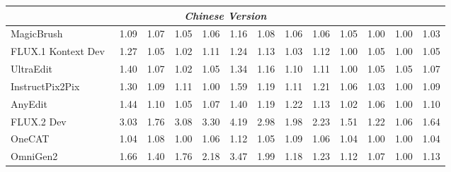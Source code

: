 \begin{table}[t]
{\begin{tabular}{l|cccccc|cccccc}
            

            

            \midrule
            \multicolumn{13}{c}{\textit{Chinese Version}} \\
            \midrule

            MagicBrush~\cite{zhang2023magicbrush}
            & 1.09 & 1.07 & 1.05 & 1.06 & 1.16 & \cellcolor[HTML]{C8C8C8}1.08 & 1.06 & 1.06 & 1.05 & 1.00 & 1.00 
            & \cellcolor[HTML]{C8C8C8}1.03 \\

            FLUX.1 Kontext Dev~\cite{labs2025flux}
            & 1.27 & 1.05 & 1.02 & 1.11 & 1.24 &\cellcolor[HTML]{C8C8C8}1.13 & 1.03 & 1.12 & 1.00 & 1.05 & 1.00
            & \cellcolor[HTML]{C8C8C8}1.05 \\

            UltraEdit~\cite{zhao2024ultraedit}
            & 1.40 & 1.07 & 1.02 & 1.05 & 1.34 &  \cellcolor[HTML]{C8C8C8}1.16 & 1.10 & 1.11 & 1.00 & 1.05 & 1.05
            & \cellcolor[HTML]{C8C8C8}1.07  \\

            InstructPix2Pix~\cite{brooks2023instructpix2pix}
            & 1.30 & 1.09 & 1.11 & 1.00 & 1.59 & \cellcolor[HTML]{C8C8C8}1.19 & 1.11 & 1.21 & 1.06 & 1.03 & 1.00
            & \cellcolor[HTML]{C8C8C8}1.09 \\

            AnyEdit~\cite{yu2025anyedit}
            & 1.44 & 1.10 & 1.05 & 1.07 & 1.40 &  \cellcolor[HTML]{C8C8C8}1.19 & 1.22 & 1.13 & 1.02 & 1.06 & 1.00
            & \cellcolor[HTML]{C8C8C8}1.10 \\

            

            FLUX.2 Dev~\cite{flux-2-2025}
            & 3.03 & 1.76 & 3.08 & 3.30 & 4.19 &  \cellcolor[HTML]{C8C8C8} 2.98  & 1.98 & 2.23 & 1.51 & 1.22 & 1.06
            & \cellcolor[HTML]{C8C8C8} 1.64  \\

            \midrule

            OneCAT~\cite{li2025onecat}
            & 1.04 & 1.08 & 1.00 & 1.06 & 1.12 & \cellcolor[HTML]{C8C8C8}1.05 & 1.09 & 1.06 & 1.04 & 1.00 & 1.00
            & \cellcolor[HTML]{C8C8C8}1.04 \\

            OmniGen2~\cite{wu2025omnigen2}
            & 1.66 & 1.40 & 1.76 & 2.18 & 3.47 &\cellcolor[HTML]{C8C8C8}1.99  & 1.18 & 1.23 & 1.12 & 1.07 & 1.00
            & \cellcolor[HTML]{C8C8C8}1.13  \\


\end{tabular}}
\end{table}
